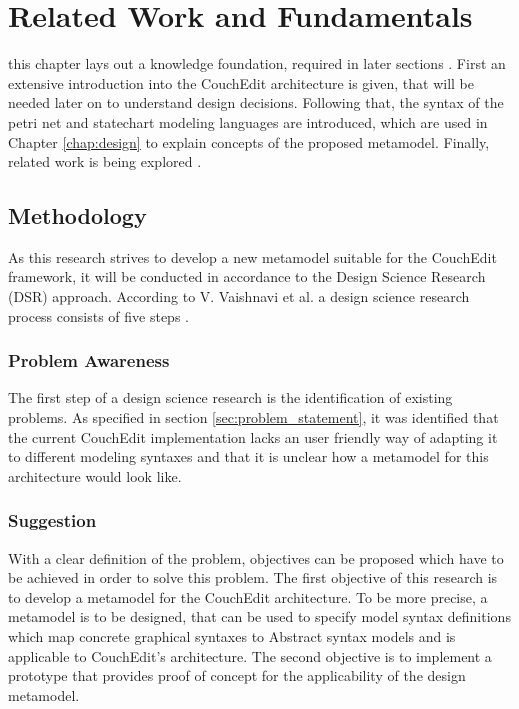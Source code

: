 \chapter{Related Work and Fundamentals}

this chapter lays out a knowledge foundation, required in later sections . First an extensive introduction into the CouchEdit architecture is given, that will be needed later on to understand design decisions. Following that, the syntax of the petri net and statechart modeling languages are introduced, which are used in Chapter \ref{chap:design} to explain concepts of the proposed metamodel. Finally, related work is being explored . 


\section{Methodology}

As this research strives to develop a new metamodel suitable for the CouchEdit framework, it will be conducted in accordance to the Design Science Research (DSR) approach. According to V. Vaishnavi et al. a design science research process consists of five steps \cite{Vaishnavi2004}.

\subsection{Problem Awareness}
The first step of a design science research is the identification of existing problems. As specified in section \ref{sec:problem_statement}, it was identified that the current CouchEdit implementation lacks an user friendly way of adapting it to different modeling syntaxes and that it is unclear how a metamodel for this architecture would look like.

\subsection{Suggestion}
With a clear definition of the problem, objectives can be proposed which have to be achieved in order to solve this problem. The first objective of this research is to develop a metamodel for the CouchEdit architecture. To be more precise, a metamodel is to be designed, that can be used to specify model syntax definitions which map concrete graphical syntaxes to Abstract syntax models and is applicable to CouchEdit's architecture. The second objective is to implement a prototype that provides proof of concept for the applicability of the design metamodel.


